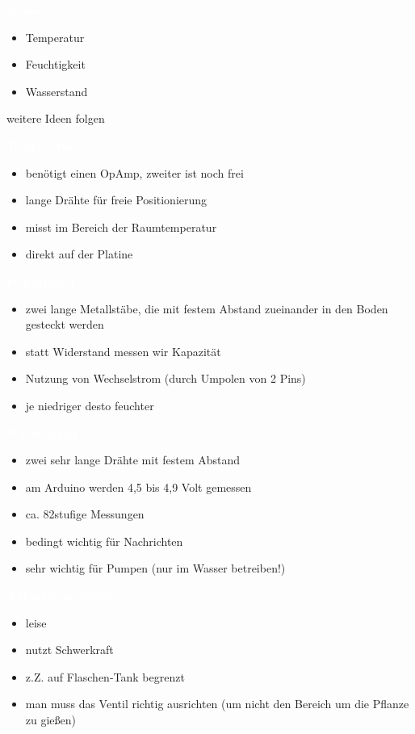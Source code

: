 \documentclass[bigger]{beamer}
\newcommand{\topic}[1]{{\huge{\textcolor{white}{\textbf{#1}}}}}
\begin{document}
\begin{frame}{\topic{Sensoren}}
	\begin{itemize}
		\item Temperatur
		\item Feuchtigkeit
		\item Wasserstand
	\end{itemize}
weitere Ideen folgen
\end{frame}

\begin{frame}{\topic{Temperatur}}
	\begin{itemize}
		\item benötigt einen OpAmp, zweiter ist noch frei
		\item lange Drähte für freie Positionierung
		\item misst im Bereich der Raumtemperatur
		\item direkt auf der Platine
	\end{itemize}
\end{frame}

\begin{frame}{\topic{Feuchtigkeit}}
	\begin{itemize}
		\item zwei lange Metallstäbe, die mit festem Abstand zueinander in den Boden gesteckt werden
		\item statt Widerstand messen wir Kapazität
		\item Nutzung von Wechselstrom (durch Umpolen von 2 Pins)
		\item je niedriger desto feuchter
	\end{itemize}
\end{frame}

\begin{frame}{\topic{Wasserstand}}
	\begin{itemize}
		\item zwei sehr lange Drähte mit festem Abstand
		\item am Arduino werden 4,5 bis 4,9 Volt gemessen
		\item ca. 82stufige Messungen
		\item bedingt wichtig für Nachrichten
		\item sehr wichtig für Pumpen (nur im Wasser betreiben!)
	\end{itemize}
\end{frame}

\begin{frame}{\topic{Aktuatoren/Ventil}}
	\begin{itemize}
		\item leise
		\item nutzt Schwerkraft
		\item z.Z. auf Flaschen-Tank begrenzt
		\item man muss das Ventil richtig ausrichten (um nicht den Bereich um die Pflanze zu gießen)
	\end{itemize}
\end{frame}
\end{document}
